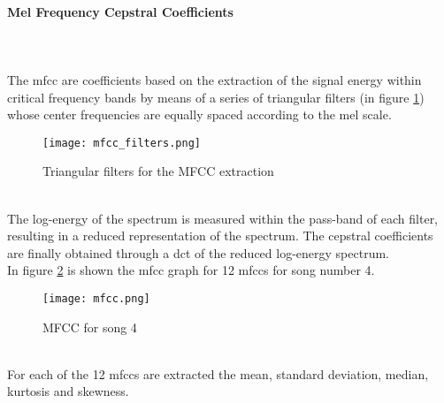 \paragraph{Mel Frequency Cepstral Coefficients}
\mbox{} \\ \\
The \gls{mfcc} are coefficients based on the extraction of the signal energy within critical frequency bands by means of a series of triangular filters (in figure \ref{fig:mfcc_filters}) whose center frequencies are equally spaced according to the mel scale.
\begin{figure}[h]
    \centering
    \texttt{[image: mfcc\_filters.png]} 
	\caption{Triangular filters for the MFCC extraction}
    \label{fig:mfcc_filters}
\end{figure}
\\
The log-energy of the spectrum is measured within the pass-band of each filter, resulting in a reduced representation of the spectrum. The cepstral coefficients are finally obtained through a \gls{dct} of the reduced log-energy spectrum.
\\
In figure \ref{fig:mfcc} is shown the \gls{mfcc} graph for 12 mfccs for song number 4.
\begin{figure}[h]
    \centering
    \texttt{[image: mfcc.png]} 
	\caption{MFCC for song 4}
    \label{fig:mfcc}
\end{figure}
\\
For each of the 12 mfccs are extracted the mean, standard deviation, median, kurtosis and skewness.

